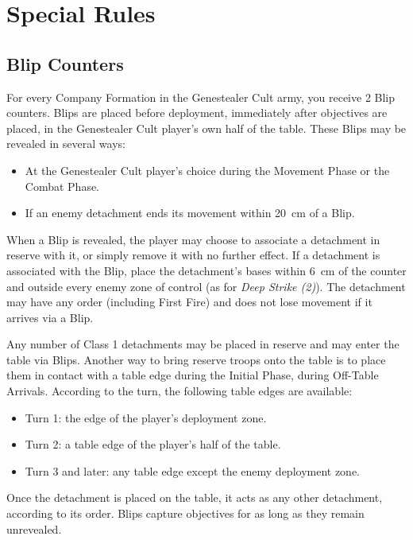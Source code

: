 \section{Special Rules}

\subsection{Blip Counters}

For every Company Formation in the Genestealer Cult army, you receive 2 Blip counters. Blips are placed before deployment, immediately after objectives are placed, in the Genestealer Cult player's own half of the table. These Blips may be revealed in several ways:

\begin{itemize}
    \item At the Genestealer Cult player's choice during the Movement Phase or the Combat Phase.
    \item If an enemy detachment ends its movement within 20~cm of a Blip.
\end{itemize}

When a Blip is revealed, the player may choose to associate a detachment in reserve with it, or simply remove it with no further effect. If a detachment is associated with the Blip, place the detachment's bases within 6~cm of the counter and outside every enemy zone of control (as for \textit{Deep Strike (2)}). The detachment may have any order (including First Fire) and does not lose movement if it arrives via a Blip.

Any number of Class 1 detachments may be placed in reserve and may enter the table via Blips. Another way to bring reserve troops onto the table is to place them in contact with a table edge during the Initial Phase, during Off-Table Arrivals. According to the turn, the following table edges are available:

\begin{itemize}
    \item Turn 1: the edge of the player's deployment zone.
    \item Turn 2: a table edge of the player's half of the table.
    \item Turn 3 and later: any table edge except the enemy deployment zone.
\end{itemize}

Once the detachment is placed on the table, it acts as any other detachment, according to its order. Blips capture objectives for as long as they remain unrevealed.
